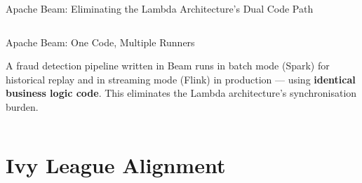 \documentclass[aspectratio=169,10pt]{beamer}
\begin{document}
\begin{frame}{Apache Beam: Eliminating the Lambda Architecture's Dual Code Path}
\begin{columns}[T]
\begin{exampleblock}{Apache Beam: One Code, Multiple Runners}
\begin{center}
        \end{center}
        \vspace{4pt}
        A fraud detection pipeline written in Beam runs in batch mode (Spark) for historical replay and in streaming mode (Flink) in production --- using \textbf{identical business logic code}.  This eliminates the Lambda architecture's synchronisation burden.
      \end{exampleblock}
  \end{columns}
\end{frame}

\section{Ivy League Alignment}
\end{document}
